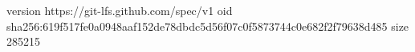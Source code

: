 version https://git-lfs.github.com/spec/v1
oid sha256:619f517fe0a0948aaf152de78dbdc5d56f07c0f5873744c0e682f2f79638d485
size 285215
